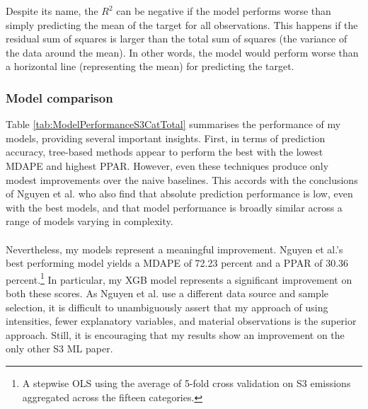 \documentclass[12pt,twoside]{report}
\begin{document}
Despite its name, the $R^{2}$ can be negative if the model performs worse than simply predicting the mean of the target for all observations. This happens if the residual sum of squares is larger than the total sum of squares (the variance of the data around the mean). In other words, the model would perform worse than a horizontal line (representing the mean) for predicting the target.  

\subsubsection{Model comparison}\label{sec:ModelComparison}

Table \ref{tab:ModelPerformanceS3CatTotal} summarises the performance of my models, providing several important insights. First, in terms of prediction accuracy, tree-based methods appear to perform the best with the lowest MDAPE and highest PPAR. However, even these techniques produce only modest improvements over the naive baselines. This accords with the conclusions of Nguyen et al. \cite{Nguyenetal2023} who also find that absolute prediction performance is low, even with the best models, and that model performance is broadly similar across a range of models varying in complexity.
\\\\
Nevertheless, my models represent a meaningful improvement. Nguyen et al.'s best performing model yields a MDAPE of 72.23 percent and a PPAR of 30.36 percent.\footnote{A stepwise OLS using the average of 5-fold cross validation on S3 emissions aggregated across the fifteen categories.} In particular, my XGB model represents a significant improvement on both these scores. As Nguyen et al. \cite{Nguyenetal2023} use a different data source and sample selection, it is difficult to unambiguously assert that my approach of using intensities, fewer explanatory variables, and material observations is the superior approach. Still, it is encouraging that my results show an improvement on the only other S3 ML paper. \\
\end{document}
